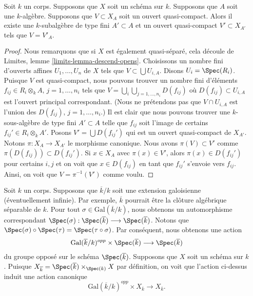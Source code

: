 \begin{lemma}
\label{lemma-descend-open}
Soit $k$ un corps. Supposons
que $X$ soit un schéma sur $k$. Supposons
que $A$ soit une $k$-algèbre. Supposons que
$V \subset X_A$ soit un ouvert
quasi-compact. Alors il existe une
$k$-subalgèbre de type fini $A' \subset A$ et un ouvert
quasi-compact $V' \subset X_{A'}$ tels que $V = V'_A$.
\end{lemma}

\begin{proof}
Nous remarquons que si $X$ est également quasi-séparé, cela
découle de Limites, lemme \ref{limits-lemma-descend-opens}.
Choisissons un nombre fini d'ouverts affines $U_1, \ldots, U_n$
de $X$ tels que $V \subset \bigcup U_{i,
A}$. Disons $U_i = \Spec(R_i)$. Puisque $V$ est quasi-compact,
nous pouvons trouver un nombre fini d'éléments $f_{ij} \in R_i
\otimes_k A$, $j = 1, \ldots, n_i$ tels que $V = \bigcup_i
\bigcup_{j = 1, \ldots, n_i} D(f_{ij})$ où $D(f_{ij}) \subset U_{i,
A}$ est l'ouvert principal correspondant. (Nous ne prétendons pas
que $V \cap U_{i, A}$ est l'union des $D(f_{ij})$, $j = 1, \ldots,
n_i$.) Il est clair que nous pouvons trouver une $k$-sous-algèbre
de type fini $A' \subset A$ telle que $f_{ij}$ soit l'image de
certains $f_{ij}' \in R_i \otimes_k A'$. Posons $V' = \bigcup
D(f_{ij}')$ qui est un ouvert quasi-compact de $X_{A'}$. Notons $\pi
: X_A \to X_{A'}$ le morphisme canonique. Nous avons $\pi(V) \subset
V'$ comme $\pi(D(f_{ij})) \subset D(f_{ij}')$. Si $x \in X_A$ avec
$\pi(x) \in V'$, alors $\pi(x) \in D(f_{ij}')$ pour certains $i, j$
et on voit que $x \in D(f_{ij})$ en tant que $f_{ij}'$ s'envoie
vers $f_{ij}$. Ainsi, on voit que $V = \pi^{-1}(V')$ comme voulu.
\end{proof}

\noindent
Soit $k$ un corps.
Supposons que $\overline{k}/k$ soit
une extension galoisienne
(éventuellement infinie). Par
exemple, $\overline{k}$ pourrait
être la clôture algébrique séparable
de $k$. Pour tout $\sigma \in
\text{Gal}(\overline{k}/k)$, nous
obtenons un automorphisme
correspondant $ \Spec(\sigma) :
\Spec(\overline{k}) \longrightarrow
\Spec(\overline{k}) $. Notons que
$\Spec(\sigma) \circ \Spec(\tau) = \Spec(\tau \circ
\sigma)$. Par conséquent, nous obtenons une action
$$
\text{Gal}(\overline{k}/k)^{opp} \times \Spec(\overline{k})
\longrightarrow
\Spec(\overline{k})
$$
du groupe opposé sur le schéma
$\Spec(\overline{k})$. Supposons que $X$ soit un
schéma sur $k$. Puisque $X_{\overline{k}} =
\Spec(\overline{k}) \times_{\Spec(k)} X$ par définition,
on voit que l'action ci-dessus induit une action canonique
\begin{equation}
\label{equation-galois-action-base-change-kbar}
\text{Gal}(\overline{k}/k)^{opp} \times X_{\overline{k}}
\longrightarrow
X_{\overline{k}}.
\end{equation}


